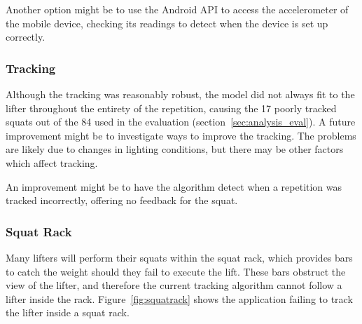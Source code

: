 Another option might be to use the Android API to access the accelerometer of the mobile device, checking its readings to detect when the device is set up correctly.

\subsubsection{Tracking}

Although the tracking was reasonably robust, the model did not always fit to the lifter throughout the entirety of the repetition, causing the 17 poorly tracked squats out of the 84 used in the evaluation (section~\ref{sec:analysis_eval}). A future improvement might be to investigate ways to improve the tracking. The problems are likely due to changes in lighting conditions, but there may be other factors which affect tracking.

An improvement might be to have the algorithm detect when a repetition was tracked incorrectly, offering no feedback for the squat.

\subsubsection{Squat Rack}

Many lifters will perform their squats within the squat rack, which provides bars to catch the weight should they fail to execute the lift. These bars obstruct the view of the lifter, and therefore the current tracking algorithm cannot follow a lifter inside the rack. Figure~\ref{fig:squatrack} shows the application failing to track the lifter inside a squat rack.

